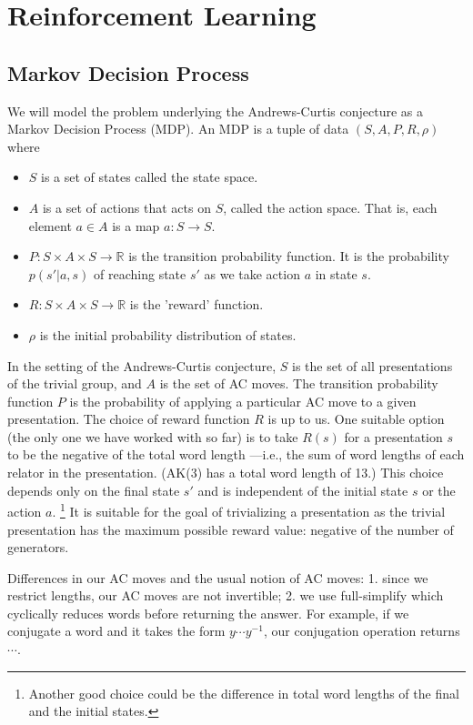 
\section{Reinforcement Learning}

\subsection{Markov Decision Process}

We will model the problem underlying the Andrews-Curtis conjecture as a Markov Decision Process (MDP).
An MDP is a tuple of data $(S, A, P, R, \rho)$ where
\begin{itemize}
	\item $S$ is a set of states called the state space.
	\item $A$ is a set of actions that acts on $S$, called the action space.
	That is, each element $a \in A$ is a map $a \colon S \to S$.
	\item $P \colon S \times A \times S \to \mathbb{R}$ is the transition
	probability function.
	It is the probability $p (s' | a, s)$ of reaching
	state $s'$ as we take action $a$ in state $s$.
	\item $R \colon S \times A \times S \to \mathbb{R}$ is the 'reward' function.
	\item $\rho$ is the initial probability distribution of states.
\end{itemize}

In the setting of the Andrews-Curtis conjecture, $S$ is the set of all presentations of the trivial group, and $A$ is the set of AC moves.
The transition probability function $P$ is the probability of applying a particular AC move to a given presentation.
The choice of reward function $R$ is up to us.
One suitable option (the only one we have worked with so far) is to take $R(s)$ for a presentation $s$ to be the negative of the total word length ---i.e., the sum of word lengths of each relator in the presentation.
(AK(3) has a total word length of 13.)
This choice depends only on the final state $s'$ and is independent of the initial state $s$
or the action $a$.
\footnote{Another good choice could be the difference in total word lengths of the final and the initial states.} It is suitable for the goal of trivializing a presentation as the trivial presentation has the maximum possible reward value: negative of the number of generators.

Differences in our AC moves and the usual notion of AC moves: 1.
since we restrict lengths, our AC moves are not invertible; 2.
we use full-simplify which cyclically reduces words before returning the answer.
For example, if we conjugate a word and it takes the form $y \cdots y^{-1}$, our conjugation operation returns $\cdots$.

